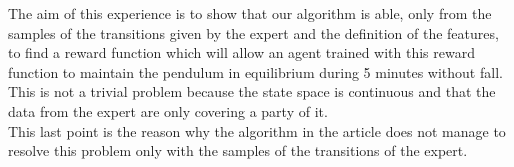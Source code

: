 \documentclass{article}
\begin{document}
The aim of this experience is to show that our algorithm is able, only from the samples of the transitions given by the expert and the definition of the features, to find a reward function
which will allow an agent trained with this reward function to maintain the pendulum in equilibrium during 5 minutes without fall. This is not a trivial problem because the state space is
continuous and that the data from the expert are only covering a party of it.\\
This last point is the reason why the algorithm in the article \citet{abbeel2004apprenticeship} does not manage to resolve this problem only with the samples of the transitions of the expert.
\end{document}
